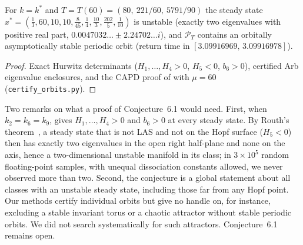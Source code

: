 \documentclass[11pt,a4paper]{report}
\begin{document}
\begin{proposition}\label{prop:conj}
For $k=k^*$ and $T=T(60)=(80,\ 221/60,\ 5791/90)$ the steady state $x^*=(\tfrac13,60,10,10,\tfrac8{45},\tfrac14,\tfrac{10}3,\tfrac{202}5,\tfrac1{10})$ is unstable (exactly two eigenvalues with positive real part, $0.0047032\ldots\pm2.24702\ldots i$), and $\mathcal P_T$ contains an orbitally asymptotically stable periodic orbit (return time in $[3.09916969,\,3.09916978]$).
\end{proposition}
\begin{proof}
Exact Hurwitz determinants ($H_1,\dots,H_4>0$, $H_5<0$, $b_6>0$), certified Arb eigenvalue enclosures, and the CAPD proof of  with $\mu=60$ (\texttt{certify\_orbits.py}).
\end{proof}

Two remarks on what a proof of Conjecture~6.1 would need. First, when $k_2=k_6=k_9$, \autocite[Prop.~4.1]{CMS2019} gives $H_1,\dots,H_4>0$ and $b_6>0$ at every steady state. By Routh's theorem~\autocite[Ch.~XV]{Gantmacher1959}, a steady state that is not LAS and not on the Hopf surface ($H_5<0$) then has exactly two eigenvalues in the open right half-plane and none on the axis, hence a two-dimensional unstable manifold in its class; in $3\times10^5$ random floating-point samples, with unequal dissociation constants allowed, we never observed more than two. Second, the conjecture is a global statement about all classes with an unstable steady state, including those far from any Hopf point. Our methods certify individual orbits but give no handle on, for instance, excluding a stable invariant torus or a chaotic attractor without stable periodic orbits. We did not search systematically for such attractors. Conjecture~6.1 remains open.
\end{document}

